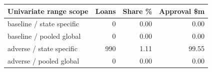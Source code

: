 \begingroup\small\setlength{\tabcolsep}{3pt}
\begin{tabularx}{\linewidth}{Xrrr}\toprule
Univariate range scope & Loans & Share \% & Approval \$m \\ \midrule
baseline / state specific & 0 & 0.00 & 0.00 \\
baseline / pooled global & 0 & 0.00 & 0.00 \\
adverse / state specific & 990 & 1.11 & 99.55 \\
adverse / pooled global & 0 & 0.00 & 0.00 \\
\bottomrule\end{tabularx}\endgroup
